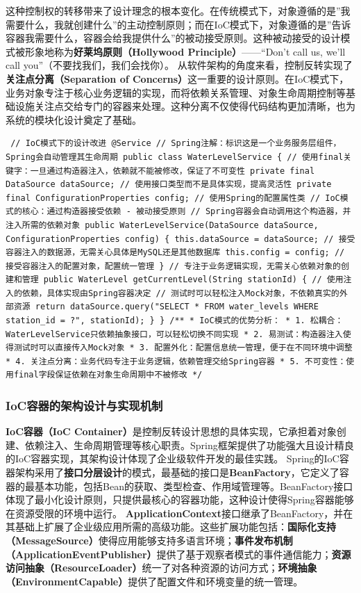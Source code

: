 这种控制权的转移带来了设计理念的根本变化。在传统模式下，对象遵循的是''我需要什么，我就创建什么''的主动控制原则；而在IoC模式下，对象遵循的是''告诉容器我需要什么，容器会给我提供什么''的被动接受原则。这种被动接受的设计模式被形象地称为\textbf{好莱坞原则（Hollywood Principle）}------``Don't call us, we'll call you''（不要找我们，我们会找你）。 从软件架构的角度来看，控制反转实现了\textbf{关注点分离（Separation of Concerns）}这一重要的设计原则。在IoC模式下，业务对象专注于核心业务逻辑的实现，而将依赖关系管理、对象生命周期控制等基础设施关注点交给专门的容器来处理。这种分离不仅使得代码结构更加清晰，也为系统的模块化设计奠定了基础。 \begin{verbatim} // IoC模式下的设计改进 @Service // Spring注解：标识这是一个业务服务层组件，Spring会自动管理其生命周期 public class WaterLevelService { // 使用final关键字：一旦通过构造器注入，依赖就不能被修改，保证了不可变性 private final DataSource dataSource; // 使用接口类型而不是具体实现，提高灵活性 private final ConfigurationProperties config; // 使用Spring的配置属性类 // IoC模式的核心：通过构造器接受依赖 - 被动接受原则 // Spring容器会自动调用这个构造器，并注入所需的依赖对象 public WaterLevelService(DataSource dataSource, ConfigurationProperties config) { this.dataSource = dataSource; // 接受容器注入的数据源，无需关心具体是MySQL还是其他数据库 this.config = config; // 接受容器注入的配置对象，配置统一管理 } // 专注于业务逻辑实现，无需关心依赖对象的创建和管理 public WaterLevel getCurrentLevel(String stationId) { // 使用注入的依赖，具体实现由Spring容器决定 // 测试时可以轻松注入Mock对象，不依赖真实的外部资源 return dataSource.query("SELECT * FROM water_levels WHERE station_id = ?", stationId); } } /** * IoC模式的优势分析： * 1. 松耦合：WaterLevelService只依赖抽象接口，可以轻松切换不同实现 * 2. 易测试：构造器注入使得测试时可以直接传入Mock对象 * 3. 配置外化：配置信息统一管理，便于在不同环境中调整 * 4. 关注点分离：业务代码专注于业务逻辑，依赖管理交给Spring容器 * 5. 不可变性：使用final字段保证依赖在对象生命周期中不被修改 */ \end{verbatim} \subsubsection{IoC容器的架构设计与实现机制}\label{iocux5bb9ux5668ux7684ux67b6ux6784ux8bbeux8ba1ux4e0eux5b9eux73b0ux673aux5236} \textbf{IoC容器（IoC Container）}是控制反转设计思想的具体实现，它承担着对象创建、依赖注入、生命周期管理等核心职责。Spring框架提供了功能强大且设计精良的IoC容器实现，其架构设计体现了企业级软件开发的最佳实践。 Spring的IoC容器架构采用了\textbf{接口分层设计}的模式，最基础的接口是\textbf{BeanFactory}，它定义了容器的最基本功能，包括Bean的获取、类型检查、作用域管理等。BeanFactory接口体现了最小化设计原则，只提供最核心的容器功能，这种设计使得Spring容器能够在资源受限的环境中运行。 \textbf{ApplicationContext}接口继承了BeanFactory，并在其基础上扩展了企业级应用所需的高级功能。这些扩展功能包括：\textbf{国际化支持（MessageSource）}使得应用能够支持多语言环境；\textbf{事件发布机制（ApplicationEventPublisher）}提供了基于观察者模式的事件通信能力；\textbf{资源访问抽象（ResourceLoader）}统一了对各种资源的访问方式；\textbf{环境抽象（EnvironmentCapable）}提供了配置文件和环境变量的统一管理。 